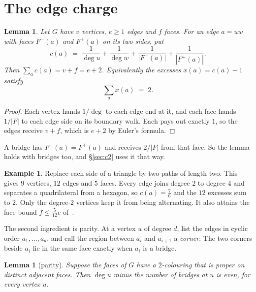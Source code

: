 \documentclass{amsart}
\theoremstyle{plain}
\newtheorem{lemma}[theorem]{Lemma}
\theoremstyle{definition}
\newtheorem{example}[theorem]{Example}
\theoremstyle{remark}
\begin{document}
\section{The edge charge}\label{sec:identity}

\begin{lemma}\label{lem:identity}
Let $G$ have $v$ vertices, $e \ge 1$ edges and $f$ faces. For an edge $a=uw$
with faces $F^-(a)$ and $F^+(a)$ on its two sides, put
\[
  c(a) \;=\; \frac{1}{\deg u} + \frac{1}{\deg w}
           + \frac{1}{|F^-(a)|} + \frac{1}{|F^+(a)|}.
\]
Then $\sum_a c(a) = v + f = e + 2$. Equivalently the excesses
$x(a) = c(a)-1$ satisfy
\begin{equation}\label{eq:identity}
  \sum_{a} x(a) \;=\; 2 .
\end{equation}
\end{lemma}

\begin{proof}
Each vertex hands $1/\deg$ to each edge end at it, and each face hands $1/|F|$
to each edge side on its boundary walk. Each pays out exactly $1$, so the edges
receive $v+f$, which is $e+2$ by Euler's formula.
\end{proof}

A bridge has $F^-(a)=F^+(a)$ and receives $2/|F|$ from that face. So the lemma
holds with bridges too, and \S\ref{sec:c2} uses it that way.

\begin{example}\label{ex:worked}
Replace each side of a triangle by two paths of length two. This gives $9$
vertices, $12$ edges and $5$ faces. Every edge joins degree $2$ to degree $4$
and separates a quadrilateral from a hexagon, so $c(a)=\frac76$ and the $12$
excesses sum to $2$. Only the degree-$2$ vertices keep it from being
alternating. It also attains the face bound $f \le \frac5{12}e$
of~\cite[(9.5)]{AHSSV2015}.
\end{example}

The second ingredient is parity. At a vertex $u$ of degree $d$, list the edges in
cyclic order $a_1,\dots,a_d$, and call the region between $a_i$ and $a_{i+1}$ a
\emph{corner}. The two corners beside $a_i$ lie in the same face exactly when
$a_i$ is a bridge.

\begin{lemma}[parity]\label{lem:parity}
Suppose the faces of $G$ have a $2$-colouring that is proper on distinct
adjacent faces. Then $\deg u$ minus the number of bridges at $u$ is even, for
every vertex $u$.
\end{lemma}
\end{document}
